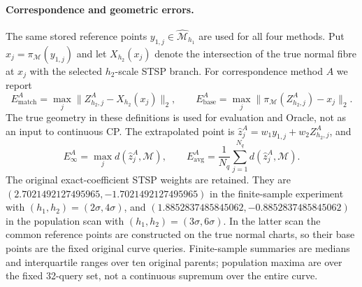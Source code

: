 \paragraph{Correspondence and geometric errors.}
The same stored reference points $y_{1,j}\in\widehat{\mathcal M}_{h_1}$ are used for all four methods. Put $x_j=\pi_{\mathcal M}(y_{1,j})$ and let $X_{h_2}(x_j)$ denote the intersection of the true normal fibre at $x_j$ with the selected $h_2$-scale STSP branch. For correspondence method $A$ we report
\[
E_{\mathrm{match}}^{A}=\max_j\|Z_{h_2,j}^{A}-X_{h_2}(x_j)\|_2,
\qquad
E_{\mathrm{base}}^{A}=\max_j\|\pi_{\mathcal M}(Z_{h_2,j}^{A})-x_j\|_2.
\]
The true geometry in these definitions is used for evaluation and Oracle, not as an input to continuous CP. The extrapolated point is $\widehat z_j^{A}=w_1y_{1,j}+w_2Z_{h_2,j}^{A}$, and
\[
E_\infty^{A}=\max_j d(\widehat z_j^{A},\mathcal M),
\qquad
E_{\mathrm{avg}}^{A}=\frac1{N_q}\sum_{j=1}^{N_q}d(\widehat z_j^{A},\mathcal M).
\]
The original exact-coefficient STSP weights are retained. They are $(2.7021492127495965,-1.7021492127495965)$ in the finite-sample experiment with $(h_1,h_2)=(2\sigma,4\sigma)$, and $(1.8852837485845062,-0.8852837485845062)$ in the population scan with $(h_1,h_2)=(3\sigma,6\sigma)$. In the latter scan the common reference points are constructed on the true normal charts, so their base points are the fixed original curve queries. Finite-sample summaries are medians and interquartile ranges over ten original parents; population maxima are over the fixed 32-query set, not a continuous supremum over the entire curve.
